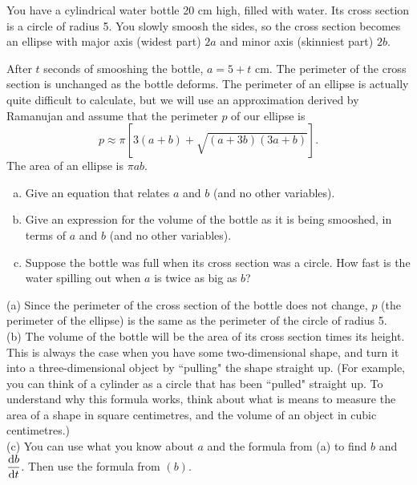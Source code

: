 \begin{question}
You have a cylindrical water bottle 20 cm high, filled with water. Its cross section is a circle of radius 5. You slowly smoosh the sides, so the cross section becomes an ellipse with major axis (widest part) $2a$ and minor axis (skinniest part) $2b$.

\begin{center}\end{center}

After $t$ seconds of smooshing the bottle, $a=5+t$ cm. The perimeter of the cross section is unchanged as the bottle deforms. The perimeter of an ellipse is actually quite difficult to calculate, but we will use an approximation derived by Ramanujan and assume that the perimeter $p$ of our ellipse is
\[p \approx \pi\left[3(a+b)+\sqrt{(a+3b)(3a+b)}\right].\]
The area of an ellipse is $\pi a b$.
\begin{enumerate}[(a)]
\item Give an equation that relates $a$ and $b$ (and no other variables).
\item Give an expression for the volume of the bottle as it is being smooshed, in terms of $a$ and $b$ (and no other variables).
\item Suppose the bottle was full when its cross section was a circle. How fast is the water spilling out when $a$ is twice as big as $b$?
\end{enumerate}
\end{question}
\begin{hint}
(a) Since the perimeter of the cross section of the bottle does not change, $p$ (the perimeter of the ellipse) is the same as the perimeter of the circle of radius 5.\\
(b) The volume of the bottle will be the area of its cross section times its height. This is always the case when you have some two-dimensional shape, and turn it into a three-dimensional object by ``pulling" the shape straight up. (For example, you can think of a cylinder as a circle that has been ``pulled" straight up. To understand why this formula works, think about what is means to measure the area of a shape in square centimetres, and the volume of an object in cubic centimetres.) \\
(c) You can use what you know about $a$ and the formula from (a) to find $b$ and $\ds\diff{b}{t}$. Then use the formula from $(b)$.
\end{hint}
